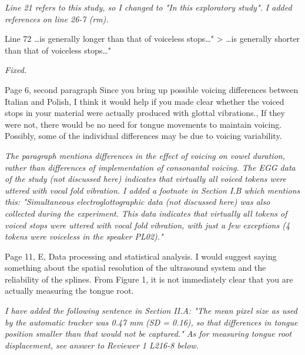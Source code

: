 \documentclass[]{article}
\begin{document}
\begin{adjustwidth}{1cm}{} \textit{
Line 21 refers to this study, so I changed to "In this exploratory study". I added references on line 26-7 (rm).
} \end{adjustwidth}

Line 72 \ldots{}is generally longer than that of voiceless
stops\ldots{}" \textgreater{} \ldots{}is generally shorter than that of
voiceless stops\ldots{}"

\begin{adjustwidth}{1cm}{} \textit{
Fixed.
} \end{adjustwidth}

Page 6, second paragraph Since you bring up possible voicing differences
between Italian and Polish, I think it would help if you made clear
whether the voiced stops in your material were actually produced with
glottal vibrations., If they were not, there would be no need for tongue
movements to maintain voicing. Possibly, some of the individual
differences may be due to voicing variability.

\begin{adjustwidth}{1cm}{} \textit{
The paragraph mentions differences in the effect of voicing on vowel duration, rather than differences of implementation of consonantal voicing. The EGG data of the study (not discussed here) indicates that virtually all voiced tokens were uttered with vocal fold vibration. I added a footnote in Section I.B which mentions this: "Simultaneous electroglottographic data (not discussed here) was also collected during the experiment. This data indicates that virtually all tokens of voiced stops were uttered with vocal fold vibration, with just a few exceptions (4 tokens were voiceless in the speaker PL02)."
} \end{adjustwidth}

Page 11, E, Data processing and statistical analysis. I would suggest
saying something about the spatial resolution of the ultrasound system
and the reliability of the splines. From Figure 1, it is not immediately
clear that you are actually measuring the tongue root.

\begin{adjustwidth}{1cm}{} \textit{
I have added the following sentence in Section II.A: "The mean pixel size as used by the automatic tracker was 0.47 mm (SD = 0.16), so that differences in tongue position smaller than that would not be captured."
As for measuring tongue root displacement, see answer to Reviewer 1 L216-8 below.
} \end{adjustwidth}
\end{document}
